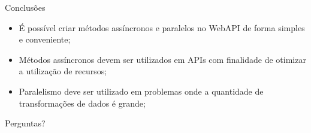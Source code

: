 \documentclass[10pt]{beamer}
\begin{document}
\begin{frame}{Conclusões}
	\begin{itemize}
		\item É possível criar métodos assíncronos e paralelos no WebAPI de forma simples e conveniente; 
		\vspace{0.2cm}
		\item Métodos assíncronos devem ser utilizados em APIs com finalidade de otimizar a utilização de recursos;
		\vspace{0.2cm}
		\item Paralelismo deve ser utilizado em problemas onde a quantidade de transformações de dados é grande;
	\end{itemize}
\end{frame}


\begin{frame}[standout]
  Perguntas?
\end{frame}
\end{document}
